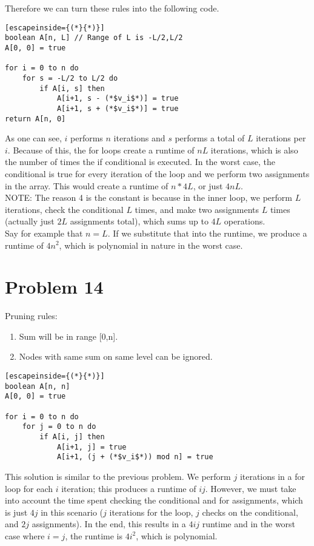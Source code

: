 \documentclass{article}
\providecommand{\prob}[1]{\section*{Problem #1}}
\begin{document}
    Therefore we can turn these rules into the following code.
    \begin{lstlisting}[escapeinside={(*}{*)}]
boolean A[n, L] // Range of L is -L/2,L/2
A[0, 0] = true

for i = 0 to n do
    for s = -L/2 to L/2 do
        if A[i, s] then
            A[i+1, s - (*$v_i$*)] = true
            A[i+1, s + (*$v_i$*)] = true
return A[n, 0]
    \end{lstlisting}
    
    As one can see, $i$ performs $n$ iterations and $s$ performs a total of $L$ iterations per $i$.  Because of this, the for loops create a runtime of $nL$ iterations, which is also the number of times the if conditional is executed.  In the worst case, the conditional is true for every iteration of the loop and we perform two assignments in the array.  This would create a runtime of $n * 4L$, or just $4nL$.  \\
    
NOTE:     The reason 4 is the constant is because in the inner loop, we perform $L$ iterations, check the conditional $L$ times, and make two assignments $L$ times (actually just $2L$ assignments total), which sums up to $4L$ operations.   \\

Say for example that $n = L$.  If we substitute that into the runtime, we produce a runtime of $4n^2$, which is polynomial in nature in the worst case.

    \prob{14}
    Pruning rules:
    \begin{enumerate}
        \item Sum will be in range [0,n].
        \item Nodes with same sum on same level can be ignored.
    \end{enumerate}

    \begin{lstlisting}[escapeinside={(*}{*)}]
boolean A[n, n]
A[0, 0] = true

for i = 0 to n do
    for j = 0 to n do
        if A[i, j] then
            A[i+1, j] = true
            A[i+1, (j + (*$v_i$*)) mod n] = true

    \end{lstlisting}
    
    This solution is similar to the previous problem.  We perform $j$ iterations in a for loop for each $i$ iteration; this produces a runtime of $ij$.  However, we must take into account the time spent checking the conditional and for assignments, which is just $4j$ in this scenario ($j$ iterations for the loop, $j$ checks on the conditional, and $2j$ assignments).  In the end, this results in a $4ij$ runtime and in the worst case where $i = j$, the runtime is $4i^2$, which is polynomial.
\end{document}
